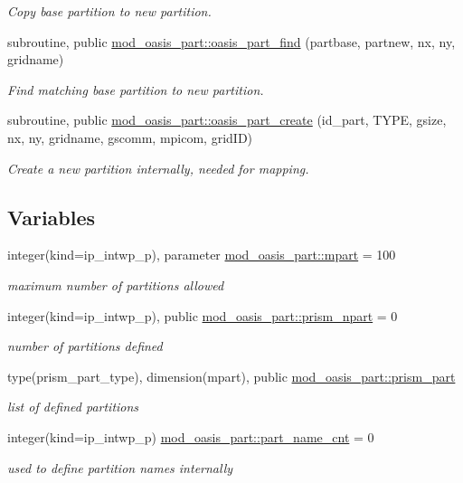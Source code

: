 \begin{DoxyCompactItemize}
\begin{DoxyCompactList}\small\item\em Copy base partition to new partition. \end{DoxyCompactList}\item 
subroutine, public \hyperlink{namespacemod__oasis__part_ac0db50937fb4217da43edcd1d1536535}{mod\+\_\+oasis\+\_\+part\+::oasis\+\_\+part\+\_\+find} (partbase, partnew, nx, ny, gridname)
\begin{DoxyCompactList}\small\item\em Find matching base partition to new partition. \end{DoxyCompactList}\item 
subroutine, public \hyperlink{namespacemod__oasis__part_aacc20c24f42edbef4ec2610bf98aadfc}{mod\+\_\+oasis\+\_\+part\+::oasis\+\_\+part\+\_\+create} (id\+\_\+part, T\+Y\+PE, gsize, nx, ny, gridname, gscomm, mpicom, grid\+ID)
\begin{DoxyCompactList}\small\item\em Create a new partition internally, needed for mapping. \end{DoxyCompactList}\end{DoxyCompactItemize}
\subsection*{Variables}
\begin{DoxyCompactItemize}
\item 
integer(kind=ip\+\_\+intwp\+\_\+p), parameter \hyperlink{namespacemod__oasis__part_ab68d087792db0351181c9a97025d793b}{mod\+\_\+oasis\+\_\+part\+::mpart} = 100
\begin{DoxyCompactList}\small\item\em maximum number of partitions allowed \end{DoxyCompactList}\item 
integer(kind=ip\+\_\+intwp\+\_\+p), public \hyperlink{namespacemod__oasis__part_ac8340e63b159a9786ad8fffabd1d47f8}{mod\+\_\+oasis\+\_\+part\+::prism\+\_\+npart} = 0
\begin{DoxyCompactList}\small\item\em number of partitions defined \end{DoxyCompactList}\item 
type(prism\+\_\+part\+\_\+type), dimension(mpart), public \hyperlink{namespacemod__oasis__part_a326ce52f630ba7e71905af864a6cb2dc}{mod\+\_\+oasis\+\_\+part\+::prism\+\_\+part}
\begin{DoxyCompactList}\small\item\em list of defined partitions \end{DoxyCompactList}\item 
integer(kind=ip\+\_\+intwp\+\_\+p) \hyperlink{namespacemod__oasis__part_a8cee930f023feb7bcad4a0cab0b490a1}{mod\+\_\+oasis\+\_\+part\+::part\+\_\+name\+\_\+cnt} = 0
\begin{DoxyCompactList}\small\item\em used to define partition names internally \end{DoxyCompactList}\end{DoxyCompactItemize}
